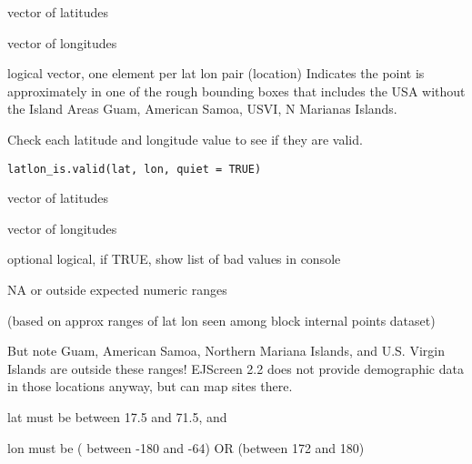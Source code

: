 \documentclass[a4paper]{book}
\begin{document}
%
\begin{Arguments}
\begin{ldescription}
\item[\code{lat}] vector of latitudes

\item[\code{lon}] vector of longitudes
\end{ldescription}
\end{Arguments}
%
\begin{Value}
logical vector, one element per lat lon pair (location)
Indicates the point is approximately in one of the
rough bounding boxes that includes the USA without
the Island Areas Guam, American Samoa, USVI, N Marianas Islands.
\end{Value}
%
\begin{SeeAlso}\relax
{}   
\end{SeeAlso}
%
\begin{Description}\relax
Check each latitude and longitude value to see if they are valid.
\end{Description}
%
\begin{Usage}
\begin{verbatim}
latlon_is.valid(lat, lon, quiet = TRUE)
\end{verbatim}
\end{Usage}
%
\begin{Arguments}
\begin{ldescription}
\item[\code{lat}] vector of latitudes

\item[\code{lon}] vector of longitudes

\item[\code{quiet}] optional logical, if TRUE, show list of bad values in console
\end{ldescription}
\end{Arguments}
%
\begin{Details}\relax
NA or outside expected numeric ranges

(based on approx ranges of lat lon seen among block internal points dataset)

But note Guam, American Samoa, Northern Mariana Islands, and U.S. Virgin Islands are outside these ranges!
EJScreen 2.2 does not provide demographic data in those locations anyway, but can map sites there.

lat must be between 17.5 and 71.5, and

lon must be ( between -180 and -64) OR (between 172 and 180)
\end{Details}
\end{document}
